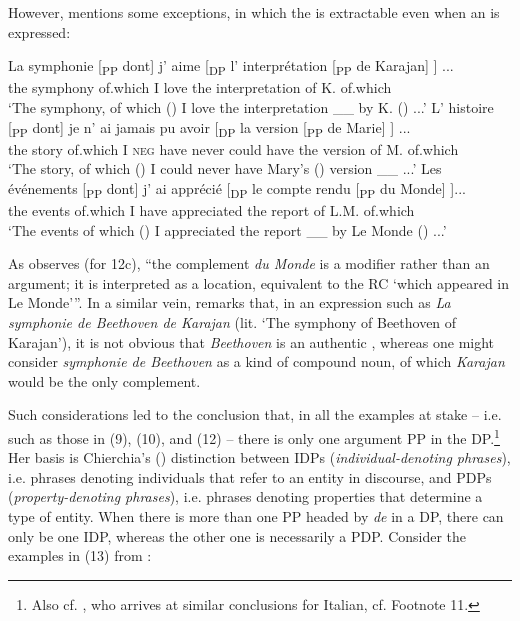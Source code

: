 \documentclass[output=paper]{langsci/langscibook}
\begin{document}
However, \citet[160]{Pollock1989} mentions some exceptions, in which the \THEME is extractable even when an \AGENT is expressed:

\ea%
    \label{ex:mensch:12}
    \ea
    \gll La symphonie  [\textsubscript{PP} dont]  j’  aime  [\textsubscript{DP} l’  interprétation      [\textsubscript{PP} de Karajan]  \soutp{[\textsubscript{PP}}{2} \soute{dont]}] ...\\
         the symphony {} of.which  I   love   {}     the interpretation     {}       of  K. {}     of.which\\
    \glt ‘The symphony, of which (\THEME) I love the interpretation \_\_ by K. (\AGENT) ...’
    \ex  
    \gll L’  histoire [\textsubscript{PP}  dont]     je   n’  ai  jamais  pu  avoir [\textsubscript{DP} la    version   [\textsubscript{PP}  de Marie] \soutp{[\textsubscript{PP}}{2}  \soute{dont]}] ...\\
         the  story  {}   of.which     I   \textsc{neg}  have  never  could  have {}  the      version {}    of M.  {}  of.which \\
    \glt ‘The story, of which (\THEME) I could never have Mary’s (\AGENT) version \_\_ ...’
    \ex  
    \gll Les  événements [\textsubscript{PP}  dont]  j’ ai  apprécié [\textsubscript{DP} le  {compte rendu}     [\textsubscript{PP}  du Monde] \soutp{[\textsubscript{PP}}{2}  \soute{dont]}]...\\
         the  events {}    of.which  I have  appreciated {}  the  report {}  of L.M.  {}  of.which\\
    \glt ‘The events of which (\THEME) I appreciated the report \_\_ by Le Monde (\AGENT) ...’
    \z
\z

As \citet[268, Footnote 31]{Godard1992} observes (for 12c), “the complement \textit{du Monde} is a modifier rather than an argument; it is interpreted as a location, equivalent to the RC ‘which appeared in Le Monde’”. In a similar vein, \citet[86–87, Footnote 2]{Milner1982} remarks that, in an expression such as \textit{La symphonie de Beethoven de Karajan} (lit. ‘The symphony of Beethoven of Karajan’), it is not obvious that \textit{Beethoven} is an authentic \AGENT, whereas one might consider \textit{symphonie de Beethoven} as a kind of compound noun, of which \textit{Karajan} would be the only complement.

Such considerations led \citet{Kolliakou1999} to the conclusion that, in all the examples at stake – i.e. such as those in (9), (10), and (12) – there is only one argument PP in the DP.\footnote{Also cf. \citet[93]{Cinque2014}, who arrives at similar conclusions for Italian, cf. Footnote 11.} Her basis is Chierchia's (\citeyear{Chierchia1982,Chierchia1985}) distinction between IDPs (\textit{individual-denoting phrases}), i.e. phrases denoting individuals that refer to an entity in discourse, and PDPs (\textit{property-denoting phrases}), i.e. phrases denoting properties that determine a type of entity. When there is more than one PP headed by \textit{de} in a DP, there can only be one IDP, whereas the other one is necessarily a PDP. Consider the examples in (13) from \citet[736]{Kolliakou1999}:
\end{document}
